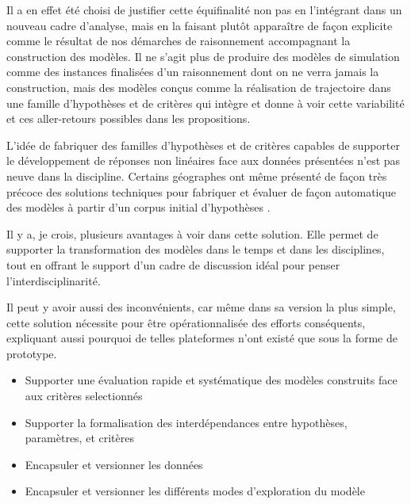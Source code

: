 Il a en effet été choisi de justifier cette équifinalité non pas en l'intégrant dans un nouveau cadre d'analyse, mais en la faisant plutôt apparaître de façon explicite comme le résultat de nos démarches de raisonnement accompagnant la construction des modèles. Il ne s'agit plus de produire des modèles de simulation comme des instances finalisées d'un raisonnement dont on ne verra jamais la construction, mais des modèles conçus comme la réalisation de trajectoire dans une famille d'hypothèses et de critères qui intègre et donne à voir cette variabilité et ces aller-retours possibles dans les propositions.

L'idée de fabriquer des familles d'hypothèses et de critères capables de supporter le développement de réponses non linéaires face aux données présentées n'est pas neuve dans la discipline. Certains géographes ont même présenté de façon très précoce des solutions techniques pour fabriquer et évaluer de façon automatique des modèles à partir d'un corpus initial d'hypothèses \autocite{Openshaw1988}.

Il y a, je crois, plusieurs avantages à voir dans cette solution.  Elle permet de supporter la transformation des modèles dans le temps et dans les disciplines, tout en offrant le support d'un cadre de discussion idéal pour penser l'interdisciplinarité.

Il peut y avoir aussi des inconvénients, car même dans sa version la plus simple, cette solution nécessite pour être opérationnalisée des efforts conséquents, expliquant aussi pourquoi de telles plateformes n'ont existé que sous la forme de prototype.

\begin{itemize}
\item Supporter une évaluation rapide et systématique des modèles construits face aux critères selectionnés
\item Supporter la formalisation des interdépendances entre hypothèses, paramètres, et critères
\item Encapsuler et versionner les données
\item Encapsuler et versionner les différents modes d'exploration du modèle
\end{itemize}



